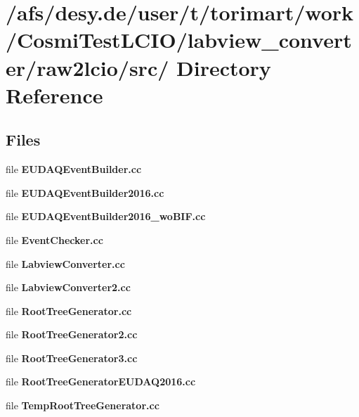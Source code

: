 \section{/afs/desy.de/user/t/torimart/work/CosmiTestLCIO/labview\_\-converter/raw2lcio/src/ Directory Reference}
\label{dir_f5886fba70a35cb1e14992eb08dc189c}
\subsection*{Files}
\begin{DoxyCompactItemize}
\item 
file {\bfseries EUDAQEventBuilder.cc}
\item 
file {\bfseries EUDAQEventBuilder2016.cc}
\item 
file {\bfseries EUDAQEventBuilder2016\_\-woBIF.cc}
\item 
file {\bfseries EventChecker.cc}
\item 
file {\bfseries LabviewConverter.cc}
\item 
file {\bfseries LabviewConverter2.cc}
\item 
file {\bfseries RootTreeGenerator.cc}
\item 
file {\bfseries RootTreeGenerator2.cc}
\item 
file {\bfseries RootTreeGenerator3.cc}
\item 
file {\bfseries RootTreeGeneratorEUDAQ2016.cc}
\item 
file {\bfseries TempRootTreeGenerator.cc}
\end{DoxyCompactItemize}
